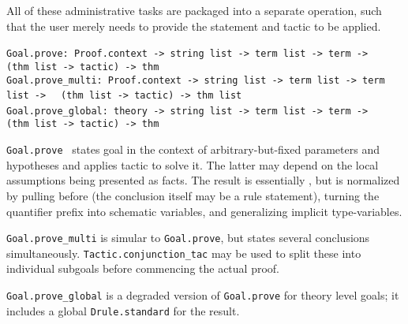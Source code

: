 \begin{isabellebody}
\begin{isamarkuptext}
  All of these administrative tasks are packaged into a separate
  operation, such that the user merely needs to provide the statement
  and tactic to be applied.%
\end{isamarkuptext}%
\isamarkuptrue%
%
\isadelimmlref
%
\endisadelimmlref
%
\isatagmlref
%
\begin{isamarkuptext}%
\begin{mldecls}
  \verb|Goal.prove: Proof.context -> string list -> term list -> term ->|\isasep\isanewline%
\verb|  (thm list -> tactic) -> thm| \\
  \verb|Goal.prove_multi: Proof.context -> string list -> term list -> term list ->|\isasep\isanewline%
\verb|  (thm list -> tactic) -> thm list| \\
  \verb|Goal.prove_global: theory -> string list -> term list -> term ->|\isasep\isanewline%
\verb|  (thm list -> tactic) -> thm| \\
  \end{mldecls}

  \begin{description}

  \item \verb|Goal.prove|~ states goal  in the context of arbitrary-but-fixed parameters 
  and hypotheses  and applies tactic  to
  solve it.  The latter may depend on the local assumptions being
  presented as facts.  The result is essentially , but is normalized by pulling \isa{{\isasymAnd}} before \isa{{\isasymLongrightarrow}}
  (the conclusion  itself may be a rule statement), turning
  the quantifier prefix into schematic variables, and generalizing
  implicit type-variables.

  \item \verb|Goal.prove_multi| is simular to \verb|Goal.prove|, but
  states several conclusions simultaneously.  \verb|Tactic.conjunction_tac| may be used to split these into individual
  subgoals before commencing the actual proof.

  \item \verb|Goal.prove_global| is a degraded version of \verb|Goal.prove| for theory level goals; it includes a global \verb|Drule.standard| for the result.

  \end{description}%
\end{isamarkuptext}%
\isamarkuptrue%
%
\endisatagmlref
{\isafoldmlref}%
%
\isadelimmlref
%
\endisadelimmlref
%
\isadelimtheory
%
\endisadelimtheory
%
\isatagtheory
{}\isamarkupfalse%
%
\endisatagtheory
{\isafoldtheory}%
%
\isadelimtheory
%
\endisadelimtheory
\isanewline
\isanewline
\end{isabellebody}%

